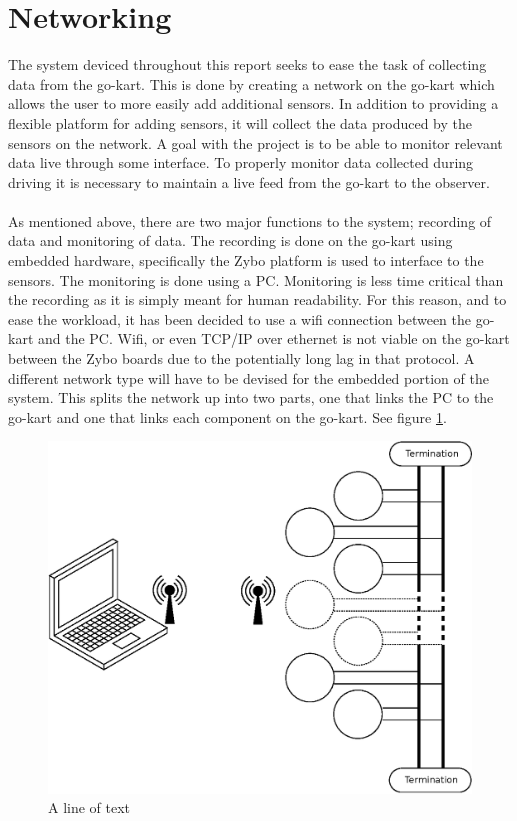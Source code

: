 \section{Networking}
The system deviced throughout this report seeks to ease the task of collecting data from the go-kart.
This is done by creating a network on the go-kart which allows the user to more easily add additional sensors.
In addition to providing a flexible platform for adding sensors, it will collect the data produced by the sensors on the network.
A goal with the project is to be able to monitor relevant data live through some interface.
To properly monitor data collected during driving it is necessary to maintain a live feed from the go-kart to the observer.
\\~\\
As mentioned above, there are two major functions to the system; recording of data and monitoring of data.
The recording is done on the go-kart using embedded hardware, specifically the Zybo platform is used to interface to the sensors.
The monitoring is done using a PC.
Monitoring is less time critical than the recording as it is simply meant for human readability.
For this reason, and to ease the workload, it has been decided to use a wifi connection between the go-kart and the PC.
Wifi, or even TCP/IP over ethernet is not viable on the go-kart between the Zybo boards due to the potentially long lag in that protocol.
A different network type will have to be devised for the embedded portion of the system.
This splits the network up into two parts, one that links the PC to the go-kart and one that links each component on the go-kart.
See figure \ref{fig:basic_network}.

\begin{figure}
	\includegraphics[width=.75\linewidth]{graphics/basic_network}
	\caption{A line of text}
	\label{fig:basic_network}
\end{figure}

